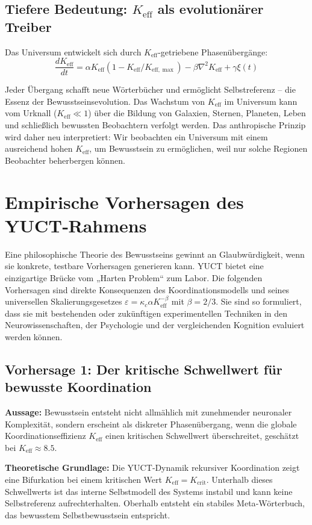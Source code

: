 \documentclass[12pt,a4paper]{article}
\newcommand{\eff}{\mathrm{eff}}
\newcommand{\Ke}{K_{\eff}}
\newcommand{\Kemax}{K_{\eff,\max}}
\begin{document}
	\subsection{Tiefere Bedeutung: $\Ke$ als evolutionärer Treiber}
	
	Das Universum entwickelt sich durch $\Ke$-getriebene Phasenübergänge:
	\[
	\frac{d\Ke}{dt} = \alpha \Ke(1 - \Ke/\Kemax) - \beta \nabla^2 \Ke + \gamma \xi(t)
	\]
	
	Jeder Übergang schafft neue Wörterbücher und ermöglicht Selbstreferenz – die Essenz der Bewusstseinsevolution. Das Wachstum von $\Ke$ im Universum kann vom Urknall ($\Ke \ll 1$) über die Bildung von Galaxien, Sternen, Planeten, Leben und schließlich bewussten Beobachtern verfolgt werden. Das anthropische Prinzip wird daher neu interpretiert: Wir beobachten ein Universum mit einem ausreichend hohen $\Ke$, um Bewusstsein zu ermöglichen, weil nur solche Regionen Beobachter beherbergen können.
	
	\section{Empirische Vorhersagen des YUCT‑Rahmens}
	
	Eine philosophische Theorie des Bewusstseins gewinnt an Glaubwürdigkeit, wenn sie konkrete, testbare Vorhersagen generieren kann. YUCT bietet eine einzigartige Brücke vom „Harten Problem“ zum Labor. Die folgenden Vorhersagen sind direkte Konsequenzen des Koordinationsmodells und seines universellen Skalierungsgesetzes \(\varepsilon = \kappa_c \alpha K_{\mathrm{eff}}^{-\beta}\) mit \(\beta = 2/3\). Sie sind so formuliert, dass sie mit bestehenden oder zukünftigen experimentellen Techniken in den Neurowissenschaften, der Psychologie und der vergleichenden Kognition evaluiert werden können.
	
	\subsection{Vorhersage 1: Der kritische Schwellwert für bewusste Koordination}
	
	\textbf{Aussage:} Bewusstsein entsteht nicht allmählich mit zunehmender neuronaler Komplexität, sondern erscheint als diskreter Phasenübergang, wenn die globale Koordinationseffizienz \(K_{\mathrm{eff}}\) einen kritischen Schwellwert überschreitet, geschätzt bei \(K_{\mathrm{eff}} \approx 8.5\).
	
	\textbf{Theoretische Grundlage:} Die YUCT‑Dynamik rekursiver Koordination zeigt eine Bifurkation bei einem kritischen Wert \(K_{\mathrm{eff}} = K_{\mathrm{crit}}\). Unterhalb dieses Schwellwerts ist das interne Selbstmodell des Systems instabil und kann keine Selbstreferenz aufrechterhalten. Oberhalb entsteht ein stabiles Meta‑Wörterbuch, das bewusstem Selbstbewusstsein entspricht.
	
\end{document}
